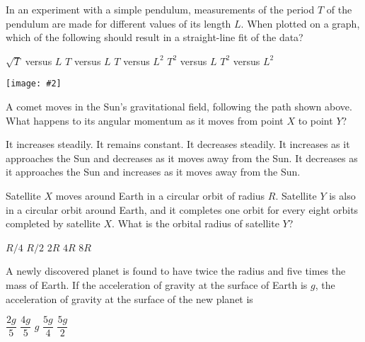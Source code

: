 \documentclass[12pt]{exam}
\newcommand{\pic}[2]{\texttt{[image: \#2]}}
\begin{document}
\begin{questions}
  \question In an experiment with a simple pendulum, measurements of the period
  $T$ of the pendulum are made for different values of its length $L$.
  When plotted on a graph, which of the following should result in a
  straight-line fit of the data?
  \begin{choices}
    \choice $\sqrt{T}$ versus $L$
    \choice $T$ versus $L$
    \choice $T$ versus $L^2$
    \choice $T^2$ versus $L$
    \choice $T^2$ versus $L^2$
  \end{choices}

  \begin{center}
    \vspace{-.3in} 
    \pic{.15}{comet}
  \end{center}
  \question A comet moves in the Sun's gravitational field, following the path
  shown above. What happens to its angular momentum as it moves from point $X$
  to point $Y$?
  \begin{choices}
    \choice It increases steadily.
    \choice It remains constant.
    \choice It decreases steadily.
    \choice It increases as it approaches the Sun and decreases as it moves
    away from the Sun.
    \choice It decreases as it approaches the Sun and increases as it moves
    away from the Sun.
  \end{choices}
  \vspace{.7in}

  \question Satellite $X$ moves around Earth in a circular orbit of radius $R$.
  Satellite $Y$ is also in a circular orbit around Earth, and it completes one
  orbit for every eight orbits completed by satellite $X$. What is the
  orbital radius of satellite $Y$?
  \begin{choices}
    \choice $R/4$
    \choice $R/2$
    \choice $2R$
    \choice $4R$
    \choice $8R$
  \end{choices}

  \question A newly discovered planet is found to have twice the radius and five
  times the mass of Earth. If the acceleration of gravity at the surface of
  Earth is $g$, the acceleration of gravity at the surface of the new planet is

  \begin{choices}
    \choice $\dfrac{2g}5$
    \choice $\dfrac{4g}5$
    \choice $g$
    \choice $\dfrac{5g}4$
    \choice $\dfrac{5g}2$
  \end{choices}

\end{questions}
\end{document}
